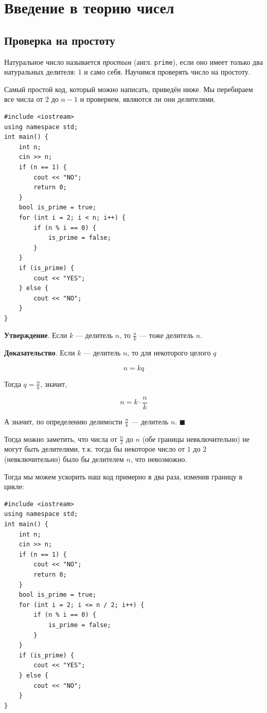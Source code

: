 \documentclass{article}
\newcommand{\stat}[1]{\textbf{Утверждение}. #1}
\begin{document}
	
	\section{Введение в теорию чисел}
	
	
	\subsection{Проверка на простоту}
	
	Натуральное число называется \textit{простым} (англ. \texttt{prime}), если оно имеет только два натуральных делителя: $1$ и само себя. Научимся проверять число на простоту.
	
	Самый простой код, который можно написать, приведён ниже. Мы перебираем все числа от $2$ до $n - 1$ и проверяем, являются ли они делителями.
	
	\begin{lstlisting}
#include <iostream>
using namespace std;
int main() {
	int n;
	cin >> n;
	if (n == 1) {
		cout << "NO";
		return 0;
	}
	bool is_prime = true;
	for (int i = 2; i < n; i++) {
		if (n % i == 0) {
			is_prime = false;
		}
	}
	if (is_prime) {
		cout << "YES";
	} else {
		cout << "NO";
	}
}
	\end{lstlisting}
	
	\stat{Если $k$ --- делитель $n$, то $\frac{n}{k}$ --- тоже делитель $n$.}
	
	\textbf{Доказательство}. Если $k$ --- делитель $n$, то для некоторого целого $q$
	
	$$ n = kq $$
	
	Тогда $q = \frac{n}{k}$, значит,
	
	$$ n = k \cdot \frac{n}{k} $$
	
	А значит, по определению делимости $\frac{n}{k}$ --- делитель $n$. $\blacksquare$
	
	Тогда можно заметить, что числа от $\frac{n}{2}$ до $n$ (обе границы невключительно) не могут быть делителями, т.к. тогда бы некоторое число от $1$ до $2$ (невключительно) было бы делителем $n$, что невозможно.
	
	Тогда мы можем ускорить наш код примерно в два раза, изменив границу в цикле:
	
	\begin{lstlisting}
#include <iostream>
using namespace std;
int main() {
	int n;
	cin >> n;
	if (n == 1) {
		cout << "NO";
		return 0;
	}
	bool is_prime = true;
	for (int i = 2; i <= n / 2; i++) {
		if (n % i == 0) {
			is_prime = false;
		}
	}
	if (is_prime) {
		cout << "YES";
	} else {
		cout << "NO";
	}
}
	\end{lstlisting}
	
\end{document}
